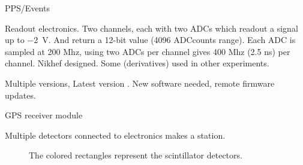 PPS/Events




Readout electronics. Two channels, each with two ADCs which readout a
signal up to \SI{-2}{\volt}. And return a 12-bit value (4096 ADCcounts
range). Each ADC is sampled at 200 Mhz, using two ADCs per channel gives
400 Mhz (2.5 ns) per channel. Nikhef designed. Some (derivatives) used
in other experiments.

Multiple versions, Latest version \hisparciii. New software needed,
remote firmware updates.

GPS receiver module \cite{ref:trimble}

Multiple detectors connected to \hisparc electronics makes a station.

\begin{figure}
    \centering
    
    \caption{ The colored
             rectangles represent the scintillator detectors.}
    \label{fig:4_detector_station}
\end{figure}
